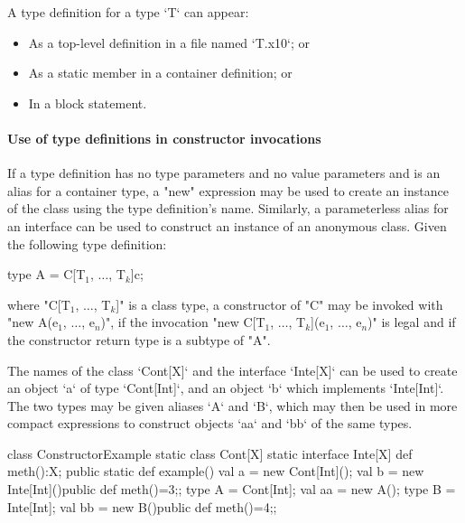 A type definition for a type \xcd`T` can appear: 
\begin{itemize}
\item As a top-level definition in a file named \xcd`T.x10`; or
\item As a static member in a container definition; or
\item In a block statement. 
\end{itemize}


\paragraph{Use of type definitions in constructor invocations}

If a type definition has no type parameters and no value
parameters and is an alias for a container type, a \xcd"new"
expression may be used to create an instance of the class using
the type definition's name.
Similarly, a parameterless alias for an interface can be used to construct an
instance of an anonymous class.
Given the following type definition:
\begin{xtenmath}
type A = C[T$_1$, $\dots$, T$_k$]{c};
\end{xtenmath}
where 
\xcdmath"C[T$_1$, $\dots$, T$_k$]" is a
class type, a constructor of \xcdmath"C" may be invoked with
\xcdmath"new A(e$_1$, $\dots$, e$_n$)", if the
invocation
\xcdmath"new C[T$_1$, $\dots$, T$_k$](e$_1$, $\dots$, e$_n$)" is
legal and if the constructor return type is a subtype of
\xcd"A".

\begin{ex}
The names of the class \xcd`Cont[X]` and the interface \xcd`Inte[X]` can be 
used to create an object \xcd`a` of type \xcd`Cont[Int]`, and an object
\xcd`b` which implements \xcd`Inte[Int]`.  The two types may be given aliases
\xcd`A` and \xcd`B`, which may then be used in more compact expressions to
construct objects \xcd`aa` and \xcd`bb` of the same types.
\begin{xten}
class ConstructorExample {
  static class Cont[X]{}
  static interface Inte[X]{
     def meth():X;
   }
  public static def example() {
    val a = new Cont[Int]();
    val b = new Inte[Int](){public def meth()=3;};
    type A = Cont[Int];
    val aa = new A();
    type B = Inte[Int];
    val bb = new B(){public def meth()=4;};
  }
}
\end{xten}
%


\end{ex}

